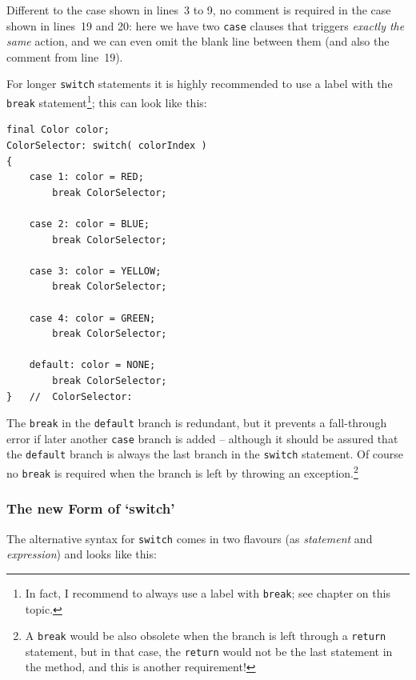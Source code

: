 Different to the case shown in lines~3 to 9, no comment is required in the case shown in lines~19 and 20: here we have two \lstinline|case| clauses that triggers \textit{exactly the same} action, and we can even omit the blank line between them (and also the comment from line~19).

For longer \lstinline|switch| statements it is highly recommended to use a label with the \lstinline|break| statement\footnote{In fact, I recommend to always use a label with \lstinline|break|; see chapter  on this topic.}; this can look like this:
\begin{lstlisting}
final Color color;
ColorSelector: switch( colorIndex )
{
    case 1: color = RED; 
        break ColorSelector;
        
    case 2: color = BLUE; 
        break ColorSelector;
        
    case 3: color = YELLOW; 
        break ColorSelector;
        
    case 4: color = GREEN; 
        break ColorSelector;
        
    default: color = NONE; 
        break ColorSelector;
}   //  ColorSelector:
\end{lstlisting}

The \lstinline|break| in the \lstinline|default| branch is redundant, but it prevents a fall-through error if later another \lstinline|case| branch is added – although it should be assured that the \lstinline|default| branch is always the last branch in the \lstinline|switch| statement. Of course no \lstinline|break| is required when the branch is left by throwing an exception.\footnote{A \lstinline|break| would be also obsolete when the branch is left through a \lstinline|return| statement, but in that case, the \lstinline|return| would not be the last statement in the method, and this is another requirement!}


\subsubsection{The new Form of ‘switch’}
The alternative syntax for \lstinline|switch| comes in two flavours (as \textit{statement} and \textit{expression}) and looks like this:

